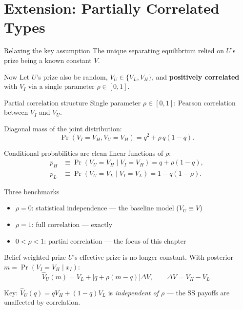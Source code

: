 \documentclass[10pt]{beamer}
\let\focusoldcitet\citet
\renewcommand{\citet}[1]{\textcolor{alert}{\focusoldcitet{#1}}}%
\newcommand{\rSS}{\mathrm{SS}}
\newcommand{\Vhat}{\widehat{V}_U}
\begin{document}
\section{Extension: Partially Correlated Types}

\begin{frame}{Relaxing the key assumption}
  The unique separating equilibrium relied on $U$'s prize being a known
  constant $V$.

  \begin{block}{Now}
    Let $U$'s prize also be random, $V_U \in \{V_L, V_H\}$, and
    \textbf{positively correlated} with $V_I$ via a single parameter
    $\rho \in [0,1]$.
  \end{block}
\end{frame}

\begin{frame}{Partial correlation structure}
  Single parameter $\rho \in [0,1]$: Pearson correlation between $V_I$ and $V_U$.

  Diagonal mass of the joint distribution:
  \begin{equation}
    \Pr(V_I=V_H, V_U=V_H) = q^2 + \rho\,q(1-q).
  \end{equation}

  Conditional probabilities are clean linear functions of $\rho$:
  \begin{align*}
    p_H &\equiv \Pr(V_U=V_H \mid V_I=V_H) = q + \rho(1-q),\\
    p_L &\equiv \Pr(V_U=V_L \mid V_I=V_L) = 1 - q(1-\rho).
  \end{align*}
\end{frame}

\begin{frame}{Three benchmarks}
  \begin{itemize}
    \item $\rho = 0$: statistical independence ---
          the baseline model ($V_U \equiv V$)
    \item $\rho = 1$: full correlation ---
          exactly \citet{fu2006}
    \item $0 < \rho < 1$: partial correlation --- the focus of this
          chapter
  \end{itemize}
\end{frame}

\begin{frame}{Belief-weighted prize}
  $U$'s effective prize is no longer constant.
  With posterior $m = \Pr(V_I=V_H \mid x_I)$:
  \begin{equation}
    \Vhat(m) = V_L + \bigl[q + \rho(m-q)\bigr]\Delta V,
    \qquad \Delta V = V_H - V_L.
  \end{equation}

  \vspace{0.3em}
  Key: $\Vhat(q) = qV_H + (1-q)V_L$ is \emph{independent of $\rho$} ---
  the $\rSS$ payoffs are unaffected by correlation.
\end{frame}
\end{document}
